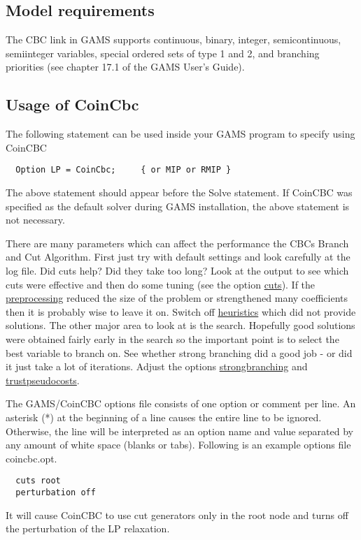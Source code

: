 \subsection{Model requirements}

The CBC link in GAMS supports continuous, binary, integer, semicontinuous, semiinteger variables, special ordered sets of type 1 and 2, and branching priorities (see chapter 17.1 of the GAMS User's Guide).

\subsection{Usage of CoinCbc}

The following statement can be used inside your GAMS program to specify using CoinCBC
\begin{verbatim}
  Option LP = CoinCbc;     { or MIP or RMIP }
\end{verbatim}

The above statement should appear before the Solve statement.
If CoinCBC was specified as the default solver during GAMS installation, the above statement is not necessary.

There are many parameters which can affect the performance the CBCs Branch and Cut Algorithm.
First just try with default settings and look carefully at the log file.
Did cuts help? Did they take too long? Look at the output to see which cuts were effective and then do some tuning (see the option \hyperlink{cuts}{cuts}).
If the \hyperlink{preprocess}{preprocessing} reduced the size of the problem or strengthened many coefficients then it is probably wise to leave it on.
Switch off \hyperlink{heuristics}{heuristics} which did not provide solutions.
The other major area to look at is the search. Hopefully good solutions were obtained fairly early in the search so the important point is to select the best variable to branch on.
See whether strong branching did a good job - or did it just take a lot of iterations.
Adjust the options \hyperlink{strongbranching}{strongbranching} and \hyperlink{trustpseudocosts}{trustpseudocosts}.

The GAMS/CoinCBC options file consists of one option or comment per line.
An asterisk (*) at the beginning of a line causes the entire line to be ignored.
Otherwise, the line will be interpreted as an option name and value separated by any amount of white space (blanks or tabs).
Following is an example options file coincbc.opt.
\begin{verbatim}
  cuts root
  perturbation off
\end{verbatim}
It will cause CoinCBC to use cut generators only in the root node and turns off the perturbation of the LP relaxation.

